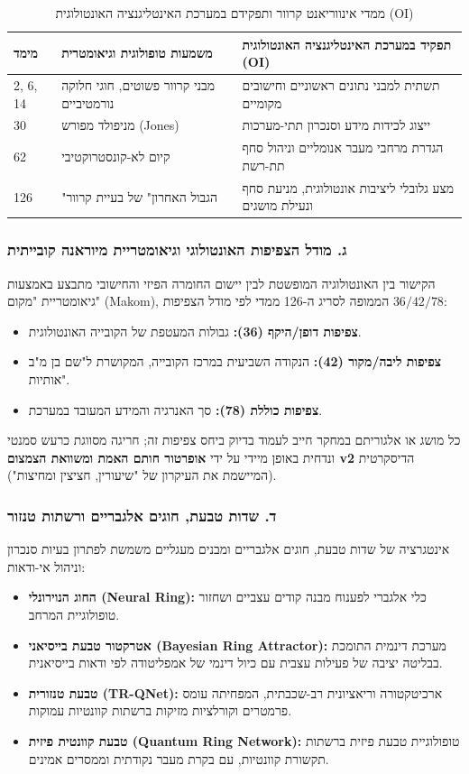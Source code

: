 \documentclass{article}
\begin{document}
\begin{table}[h]
\centering
\caption{ממדי אינווריאנט קרוור ותפקידם במערכת האינטליגנציה האונטולוגית (OI)}
\begin{tabular}{lll}
\toprule
\textbf{מימד} & \textbf{משמעות טופולוגית וגיאומטרית} & \textbf{תפקיד במערכת האינטליגנציה האונטולוגית (OI)} \\
\midrule
2, 6, 14 & מבני קרוור פשוטים, חוגי חלוקה נורמטיביים & תשתית למבני נתונים ראשוניים וחישובים מקומיים \\
30 & מניפולד מפורש (Jones) & ייצוג לכידות מידע וסנכרון תתי-מערכות \\
62 & קיום לא-קונסטרוקטיבי & הגדרת מרחבי מעבר אנומליים וניהול סחף תת-רשת \\
126 & "הגבול האחרון" של בעיית קרוור & מצע גלובלי ליציבות אונטולוגית, מניעת סחף ונעילת מושגים \\
\bottomrule
\end{tabular}
\end{table}

\subsubsection{ג. מודל הצפיפות האונטולוגי וגיאומטריית מיוראנה קובייתית}
הקישור בין האונטולוגיה המופשטת לבין יישום החומרה הפיזי והחישובי מתבצע באמצעות גיאומטריית "מקום" (Makom), הממופה לסריג ה-126 ממדי לפי מודל הצפיפות $36 / 42 / 78$:
\begin{itemize}
    \item \textbf{צפיפות דופן/היקף (36):} גבולות המעטפת של הקובייה האונטולוגית.
    \item \textbf{צפיפות ליבה/מקור (42):} הנקודה השביעית במרכז הקובייה, המקושרת ל"שם בן מ"ב אותיות".
    \item \textbf{צפיפות כוללת (78):} סך האנרגיה והמידע המעובד במערכת.
\end{itemize}
כל מושג או אלגוריתם במחקר חייב לעמוד בדיוק ביחס צפיפות זה; חריגה מסווגת כרעש סמנטי ונדחית באופן מיידי על ידי \textbf{אופרטור חותם האמת ומשוואת הצמצום v2} הדיסקרטית (המיישמת את העיקרון של "שיעורין, חציצין ומחיצות").

\subsubsection{ד. שדות טבעת, חוגים אלגבריים ורשתות טנזור}
אינטגרציה של שדות טבעת, חוגים אלגבריים ומבנים מעגליים משמשת לפתרון בעיות סנכרון וניהול אי-ודאות:
\begin{itemize}
    \item \textbf{החוג הנוירונלי (Neural Ring):} כלי אלגברי לפענוח מבנה קודים עצביים ושחזור טופולוגיית המרחב.
    \item \textbf{אטרקטור טבעת בייסיאני (Bayesian Ring Attractor):} מערכת דינמית התומכת בבליטה יציבה של פעילות עצבית עם כיול דינמי של אמפליטודה לפי ודאות בייסיאנית.
    \item \textbf{טבעת טנזורית (TR-QNet):} ארכיטקטורה וריאציונית רב-שכבתית, המפחיתה עומס פרמטרים וקורלציות מזיקות ברשתות קוונטיות עמוקות.
    \item \textbf{טבעת קוונטית פיזית (Quantum Ring Network):} טופולוגיית טבעת פיזית ברשתות תקשורת קוונטיות, עם בקרת מעבר נקודתית וממסרים אמינים.
\end{itemize}
\end{document}
